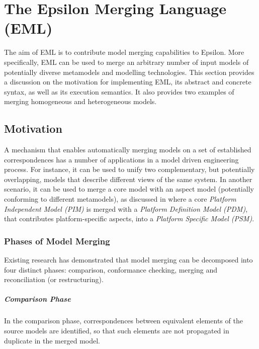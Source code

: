 \chapter{The Epsilon Merging Language (EML)}
\label{sec:EML}

The aim of EML is to contribute model merging capabilities to Epsilon. More specifically, EML can be used to merge an arbitrary number of input models of potentially diverse metamodels and modelling technologies. This section provides a discussion on the motivation for implementing EML, its abstract and concrete syntax, as well as its execution semantics. It also provides two examples of merging homogeneous and heterogeneous models.

\section{Motivation}

A mechanism that enables automatically merging models on a set of established correspondences has a number of applications in a model driven engineering process. For instance, it can be used to unify two complementary, but potentially overlapping, models that describe different views of the same system. In another scenario, it can be used to merge a core model with an aspect model (potentially conforming to different metamodels), as discussed in \cite{MDAGuide} where a core \emph{Platform Independent Model (PIM)} is merged with a \emph{Platform Definition Model (PDM)}, that contributes platform-specific aspects, into a \emph{Platform Specific Model (PSM)}.

\subsection{Phases of Model Merging}

Existing research \cite{Pottinger2003,Batini1986} has demonstrated that model merging can be decomposed into four distinct phases: comparison, conformance checking, merging and reconciliation (or restructuring).

\paragraph{Comparison Phase} In the comparison phase, correspondences between equivalent elements of the source models are identified, so that such elements are not propagated in duplicate in the merged model.


